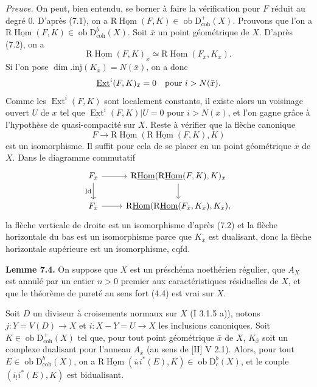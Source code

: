 \documentclass[11pt]{article}
\DeclareMathOperator{\Hom}{Hom}
\DeclareMathOperator{\Ext}{Ext}
\newcommand{\R}{\mathrm{R}}
\newcommand{\D}{\mathrm{D}}
\newcommand{\ob}{\operatorname{ob}}
\providecommand{\Hom}{\operatorname{Hom}}
\providecommand{\ob}{\operatorname{ob}}
\providecommand{\R}{\mathrm R}
\providecommand{\Hom}{\operatorname{Hom}}
\begin{document}
\emph{Preuve.} On peut, bien entendu, se borner à faire la vérification pour $F$ réduit au degré $0$. D'après (7.1), on a $\R\underline{\Hom}(F,K)\in\ob\D^{+}_{\mathrm{coh}}(X)$. Prouvons que l'on a $\R\underline{\Hom}(F,K)\in\ob\D^{b}_{\mathrm{coh}}(X)$. Soit $\bar{x}$ un point géométrique de $X$. D'après (7.2), on a
\[
        \R\underline{\Hom}(F,K)_{\bar{x}}\simeq \R\underline{\Hom}(F_{\bar{x}},K_{\bar{x}}).
\]
Si l'on pose $\dim.\mathrm{inj}(K_{\bar{x}})=N(\bar{x})$, on a donc
\[
        \underline{\Ext}^i(F,K)_{\bar{x}}=0\quad\hbox{pour }i>N(\bar{x}).
\]
Comme les $\underline{\Ext}^{i}(F,K)$ sont localement constants, il existe alors un voisinage ouvert $U$ de $x$ tel que $\underline{\Ext}^{i}(F,K)|U=0$ pour $i>N(\bar{x})$, et l'on gagne grâce à l'hypothèse de quasi-compacité sur $X$. Reste à vérifier que la flèche canonique
\[
        F\longrightarrow \R\underline{\Hom}(\R\underline{\Hom}(F,K),K)
\]
est un isomorphisme. Il suffit pour cela de se placer en un point géométrique $\bar{x}$ de $X$. Dans le diagramme commutatif
\[
\begin{tikzcd}
F_{\bar{x}} \arrow[r] \arrow[d,"\mathrm{Id}"'] & \R\underline{\Hom}(\R\underline{\Hom}(F,K),K)_{\bar{x}} \arrow[d]\\
F_{\bar{x}} \arrow[r] & \R\underline{\Hom}(\R\underline{\Hom}(F_{\bar{x}},K_{\bar{x}}),K_{\bar{x}}),
\end{tikzcd}
\]
la flèche verticale de droite est un isomorphisme d'après (7.2) et la flèche horizontale du bas est un isomorphisme parce que $K_{\bar{x}}$ est dualisant, donc la flèche horizontale supérieure est un isomorphisme, cqfd.

\textbf{Lemme 7.4.} On suppose que $X$ est un préschéma noethérien régulier, que $A_X$ est annulé par un entier $n>0$ premier aux caractéristiques résiduelles de $X$, et que le théorème de pureté au sens fort (4.4) est vrai sur $X$.

Soit $D$ un diviseur à croisements normaux sur $X$ (I 3.1.5 a)), notons $j:Y=V(D)\to X$ et $i:X-Y=U\to X$ les inclusions canoniques. Soit $K\in\ob\D^{+}_{\mathrm{coh}}(X)$ tel que, pour tout point géométrique $\bar{x}$ de $X$, $K_{\bar{x}}$ soit un complexe dualisant pour l'anneau $A_{\bar{x}}$ (au sens de [H] V 2.1). Alors, pour tout $E\in\ob\D^{b}_{\mathrm{coh}}(X)$, on a $\R\underline{\Hom}(i_!i^*(E),K)\in\ob\D^{b}_{c}(X)$, et le couple $(i_!i^*(E),K)$ est bidualisant.
\end{document}
